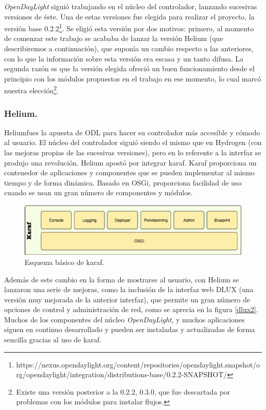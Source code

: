 \documentclass[a4paper,11pt]{book}
\begin{document}
\emph{OpenDayLight} siguió trabajando en el núcleo del controlador, lanzando sucesivas versiones de éste. Una de estas versiones fue elegida para realizar el proyecto, la versión base 0.2.2\footnote{https://nexus.opendaylight.org/content/repositories/opendaylight.snapshot/org/opendaylight/integration/distributions-base/0.2.2-SNAPSHOT/}. Se eligió esta versión por dos motivos: primero, al momento de comenzar este trabajo se acababa de lanzar la versión Helium (que describiremos a continuación), que suponía un cambio respecto a las anteriores, con lo que la información sobre esta versión era escasa y un tanto difusa. La segunda razón es que la versión elegida ofreció un buen funcionamiento desde el principio con los módulos propuestos en el trabajo en ese momento, lo cual marcó nuestra elección\footnote{Existe una versión posterior a la 0.2.2, 0.3.0, que fue descartada por problemas con los módulos para instalar flujos.}.

\subsubsection{Helium.} Heliumfues la apuesta de \ac{ODL} para hacer su controlador más accesible y cómodo al usuario. El núcleo del controlador siguió siendo el mismo que en Hydrogen (con las mejoras propias de las sucesivas versiones), pero en lo referente a la interfaz se produjo una revolución. Helium apostó por integrar karaf\cite{karaf}. Karaf proporciona un contenedor de aplicaciones y componentes que se pueden implementar al mismo tiempo y de forma dinámica. Basado en OSGi, proporciona facilidad de uso cuando se usan un gran número de componentes y módulos.

\begin{figure}[tb]
\centering
\includegraphics[scale=0.65]{./figuras/karaf}
\caption{Esquema básico de karaf.}\label{karaf}
\end{figure}

Además de este cambio en la forma de mostrarse al usuario, con Helium se lanzaron una serie de mejoras, como la inclusión de la interfaz web DLUX (una versión muy mejorada de la anterior interfaz), que permite un gran número de opciones de control y administración de red, como se aprecia en la figura \ref{dlux2}. Muchos de los componentes del núcleo \emph{OpenDayLight}, y muchos aplicaciones siguen en continuo desarrollado y pueden ser instaladas y actualizadas de forma sencilla gracias al uso de karaf. 
\end{document}
